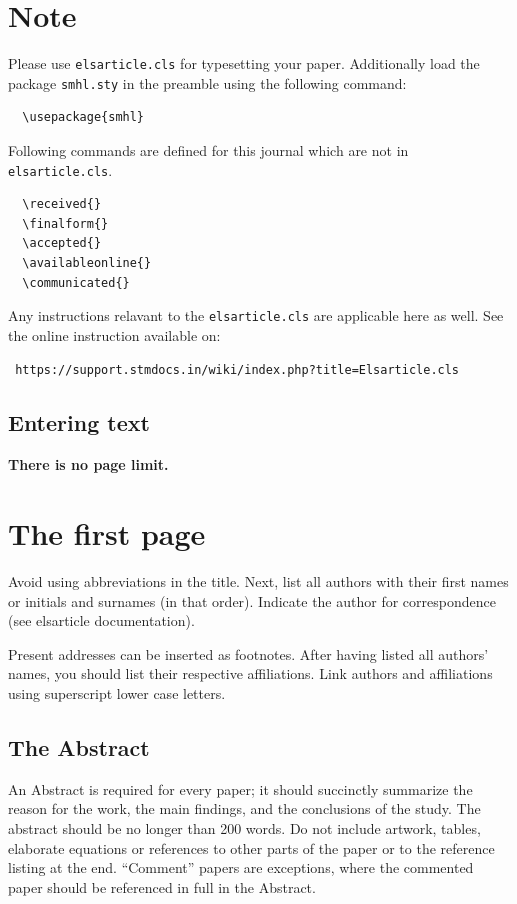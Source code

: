 \documentclass[times,onecolumn,final,longtitle]{elsarticle}
\begin{document}

\section{Note}
\label{sec1}
Please use \verb+elsarticle.cls+ for typesetting your paper.
Additionally load the package \verb+smhl.sty+ in the preamble using
the following command:
\begin{verbatim} 
  \usepackage{smhl}
\end{verbatim}

Following commands are defined for this journal which are not in
\verb+elsarticle.cls+.
\begin{verbatim}
  \received{}
  \finalform{}
  \accepted{}
  \availableonline{}
  \communicated{}
\end{verbatim}

Any instructions relavant to the \verb+elsarticle.cls+ are applicable
here as well. See the online instruction available on:
\begin{verbatim}
 https://support.stmdocs.in/wiki/index.php?title=Elsarticle.cls 
\end{verbatim}

\subsection{Entering text}
\textcolor{newcolor}{\bf There is no page limit.}

\section{The first page}
Avoid using abbreviations in the title. Next, list all authors with
their first names or initials and surnames (in that order). Indicate
the author for correspondence (see elsarticle documentation).

Present addresses can be inserted as footnotes. After having listed all
authors' names, you should list their respective affiliations. Link
authors and affiliations using superscript lower case letters.

\subsection{The Abstract}
An Abstract is required for every paper; it should succinctly summarize
the reason for the work, the main findings, and the conclusions of the
study. The abstract should be no longer than 200 words. Do not include
artwork, tables, elaborate equations or references to other parts of
the paper or to the reference listing at the end. ``Comment'' papers
are exceptions, where the commented paper should be referenced in full
in the Abstract.
\end{document}
